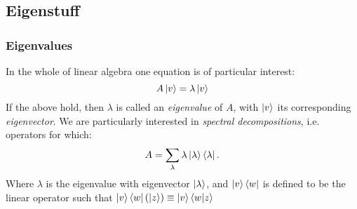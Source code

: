 \documentclass{beamer}
\begin{document}
    \subsection{Eigenstuff}
    \begin{frame}
        \frametitle{Eigenvalues}
        In the whole of linear algebra one equation is of particular interest:
        \begin{equation}
            A\ket{v} = \lambda \ket{v}
        \end{equation}
        If the above hold, then $\lambda$ is called an \textit{eigenvalue} of $A$, with $\ket{v}$ its corresponding \textit{eigenvector}.
        We are particularly interested in \textit{spectral decompositions}, i.e. operators for which:
        \begin{equation}
            A = \sum_\lambda \lambda \ket{\lambda}\bra{\lambda}.
        \end{equation}
        Where $\lambda$ is the eigenvalue with eigenvector $\ket{\lambda}$, and $\ket{v}\bra{w}$ is defined to 
        be the linear operator such that $\ket{v}\bra{w}(\ket{z}) \equiv \ket{v}\braket{w|z}$
    
    \end{frame}
\end{document}
